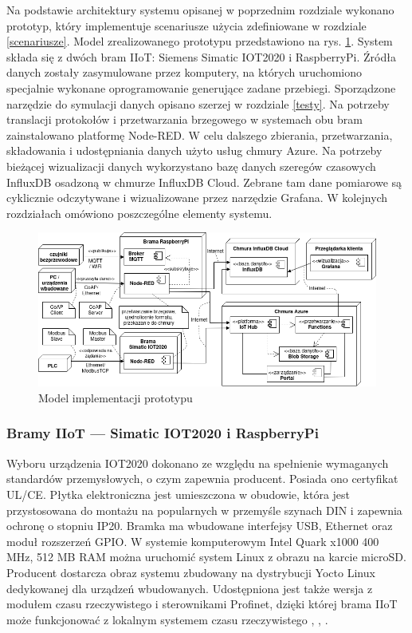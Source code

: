 \documentclass[a4paper, 12pt, twoside]{article}
\begin{document}
Na podstawie architektury systemu opisanej w poprzednim rozdziale wykonano
prototyp, który implementuje scenariusze użycia zdefiniowane w rozdziale \ref{scenariusze}.
Model zrealizowanego prototypu przedstawiono na rys. \ref{fig:impl}.
System składa się z dwóch bram IIoT: Siemens Simatic IOT2020 i RaspberryPi.
Źródła danych
zostały zasymulowane przez komputery, na których uruchomiono specjalnie wykonane oprogramowanie
generujące zadane przebiegi. Sporządzone narzędzie do symulacji danych opisano szerzej w rozdziale
\ref{testy}. Na potrzeby translacji protokołów
i przetwarzania brzegowego w systemach obu bram zainstalowano platformę Node-RED.
W celu dalszego zbierania, przetwarzania, składowania i udostępniania danych
użyto usług chmury Azure. Na potrzeby bieżącej wizualizacji danych wykorzystano
bazę danych szeregów czasowych InfluxDB osadzoną w chmurze InfluxDB Cloud.
Zebrane tam dane pomiarowe są cyklicznie odczytywane i wizualizowane przez narzędzie Grafana.
W kolejnych rozdziałach omówiono poszczególne elementy systemu.

\begin{figure}[h]
      \centering
      \includegraphics[width=\textwidth]{impl.png}
      \caption{Model implementacji prototypu}
      \label{fig:impl}
\end{figure}

\subsubsection{Bramy IIoT --- Simatic IOT2020 i RaspberryPi}

Wyboru urządzenia IOT2020 dokonano ze względu na spełnienie wymaganych standardów przemysłowych,
o czym zapewnia producent. Posiada ono certyfikat UL/CE. Płytka elektroniczna
jest umieszczona w obudowie, która jest przystosowana do montażu
na popularnych w przemyśle szynach DIN i zapewnia ochronę o stopniu IP20. Bramka
ma wbudowane interfejsy USB, Ethernet oraz moduł rozszerzeń GPIO. W systemie
komputerowym Intel Quark x1000 400 MHz, 512 MB RAM można uruchomić system
Linux z obrazu na karcie microSD. Producent dostarcza obraz systemu zbudowany
na dystrybucji Yocto Linux dedykowanej dla urządzeń wbudowanych. Udostępniona
jest także wersja z modułem czasu rzeczywistego i sterownikami Profinet,
dzięki której brama IIoT może funkcjonować z lokalnym systemem czasu rzeczywistego
\cite{simatic-iot-sepc}, \cite{simatic-iot-profinet}, \cite{modbus-iot-gateway}.
\end{document}
